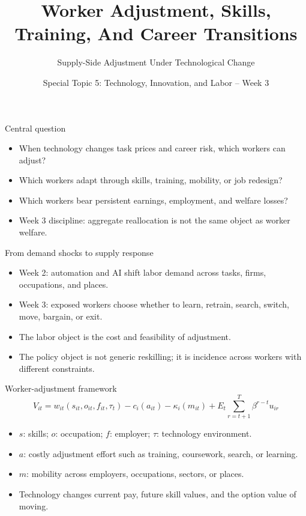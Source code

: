 \documentclass[aspectratio=169,11pt]{beamer}
\title{Worker Adjustment, Skills, Training, And Career Transitions}
\subtitle{Supply-Side Adjustment Under Technological Change}
\author{Special Topic 5: Technology, Innovation, and Labor -- Week 3}
\date{}
\begin{document}
\begin{frame}
  \titlepage
\end{frame}

\begin{frame}{Central question}
\begin{itemize}
    \item When technology changes task prices and career risk, which workers can adjust?
    \item Which workers adapt through skills, training, mobility, or job redesign?
    \item Which workers bear persistent earnings, employment, and welfare losses?
    \item Week 3 discipline: aggregate reallocation is not the same object as worker welfare.
\end{itemize}
\end{frame}

\begin{frame}{From demand shocks to supply response}
\begin{itemize}
    \item Week 2: automation and AI shift labor demand across tasks, firms, occupations, and places.
    \item Week 3: exposed workers choose whether to learn, retrain, search, switch, move, bargain, or exit.
    \item The labor object is the cost and feasibility of adjustment.
    \item The policy object is not generic reskilling; it is incidence across workers with different constraints.
\end{itemize}
\end{frame}

\begin{frame}{Worker-adjustment framework}
\small
\[
V_{it}
=
w_{it}(s_{it}, o_{it}, f_{it}, \tau_t)
- c_i(a_{it})
- \kappa_i(m_{it})
+ E_t \sum_{r=t+1}^{T} \beta^{r-t} u_{ir}
\]
\begin{itemize}
    \item $s$: skills; $o$: occupation; $f$: employer; $\tau$: technology environment.
    \item $a$: costly adjustment effort such as training, coursework, search, or learning.
    \item $m$: mobility across employers, occupations, sectors, or places.
    \item Technology changes current pay, future skill values, and the option value of moving.
\end{itemize}
\end{frame}
\end{document}
